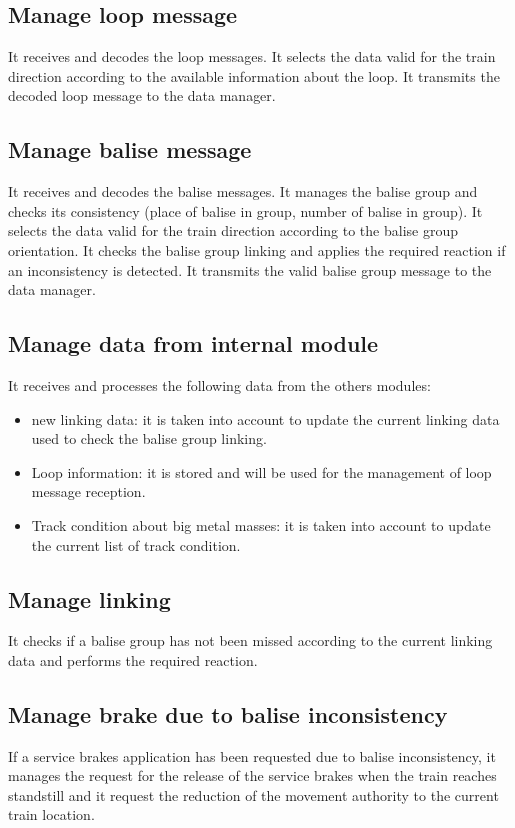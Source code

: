 \documentclass[nocc]{template/openetcs_report}
\begin{document}
\subsection{Manage loop message}
It receives and decodes the loop messages.
It selects the data valid for the train direction according to the available information about the loop.
It transmits the decoded loop message to the data manager.

\subsection{Manage balise message}
It receives and decodes the balise messages.
It manages the balise group and checks its consistency (place of balise in group, number of balise in group).
It selects the data valid for the train direction according to the balise group orientation.
It checks the balise group linking and applies the required reaction if an inconsistency is detected.
It transmits the valid balise group message to the data manager.

\subsection{Manage data from internal module}
It receives and processes the following data from the others modules:
\begin{itemize}
\item new linking data: it is taken into account to update the current linking data used to check the balise group linking.
\item Loop information: it is stored and will be used for the management of loop message reception.
\item Track condition about big metal masses: it is taken into account to update the current list of track condition.
\end{itemize}

\subsection{Manage linking}
It checks if a balise group has not been missed according to the current linking data and performs the required reaction.

\subsection{Manage brake due to balise inconsistency}
If a service brakes application has been requested due to balise inconsistency, it manages the request for the release of the service brakes when the train reaches standstill and it request the reduction of the movement authority to the current train location.
\end{document}
